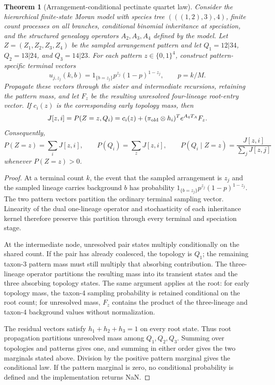 \documentclass[11pt]{article}
\newtheorem{theorem}{Theorem}
\begin{document}
\begin{theorem}[Arrangement-conditional pectinate quartet law]
Consider the hierarchical finite-state Moran model with species tree
$(((1,2),3),4)$, finite count processes on all branches, conditional binomial
inheritance at speciation, and the structured genealogy operators $A_2,A_3,A_4$
defined by the model. Let $Z=(Z_1,Z_2,Z_3,Z_4)$ be the sampled arrangement
pattern and let $Q_1=12|34$, $Q_2=13|24$, and $Q_3=14|23$. For each pattern
$z\in\{0,1\}^4$, construct pattern-specific terminal vectors
\[
u_{j,z_j}(k,b)=1_{\{b=z_j\}}p^{z_j}(1-p)^{1-z_j},
\qquad p=k/M.
\]
Propagate these vectors through the sister and intermediate recursions,
retaining the pattern mass, and let $F_z$ be the resulting unresolved
four-lineage root-entry vector. If $c_i(z)$ is the corresponding early
topology mass, then
\[
J[z,i]=P(Z=z,Q_i)=c_i(z)+
(\pi_{\rm old}\otimes h_i)^T e^{A_4T_A}F_z.
\]
Consequently,
\[
P(Z=z)=\sum_iJ[z,i],\qquad
P(Q_i)=\sum_zJ[z,i],\qquad
P(Q_i\mid Z=z)=\frac{J[z,i]}{\sum_jJ[z,j]}
\]
whenever $P(Z=z)>0$.
\end{theorem}

\begin{proof}
At a terminal count $k$, the event that the sampled arrangement is $z_j$ and
the sampled lineage carries background $b$ has probability
$1_{\{b=z_j\}}p^{z_j}(1-p)^{1-z_j}$. The two pattern vectors partition the
ordinary terminal sampling vector. Linearity of the dual one-lineage operator
and stochasticity of each inheritance kernel therefore preserve this
partition through every terminal and speciation stage.

At the intermediate node, unresolved pair states multiply conditionally on the
shared count. If the pair has already coalesced, the topology is $Q_1$; the
remaining taxon-3 pattern mass must still multiply that absorbing contribution.
The three-lineage operator partitions the resulting mass into its transient
states and the three absorbing topology states. The same argument applies at
the root: for early topology mass, the taxon-4 sampling probability is retained
conditional on the root count; for unresolved mass, $F_z$ contains the product
of the three-lineage and taxon-4 background values without normalization.

The residual vectors satisfy $h_1+h_2+h_3=1$ on every root state. Thus root
propagation partitions unresolved mass among $Q_1,Q_2,Q_3$. Summing over
topologies and patterns gives one, and summing in either order gives the two
marginals stated above. Division by the positive pattern marginal gives the
conditional law. If the pattern marginal is zero, no conditional probability
is defined and the implementation returns NaN.
\end{proof}
\end{document}
